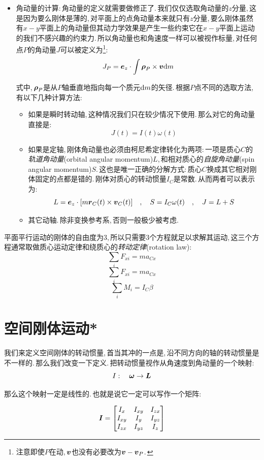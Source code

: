 \begin{itemize}
\item 角动量的计算:\,角动量的定义就需要做修正了.\,我们仅仅选取角动量的$z$分量,\,这是因为要么刚体是薄的,\,对平面上的点角动量本来就只有$z$分量,\,要么刚体虽然有$x-y$平面上的角动量但其动力学效果是产生一些约束它在$x-y$平面上运动的我们不感兴趣的约束力.\,所以角动量也和角速度一样可以被视作标量,\,对任何点$P$的角动量$J$可以被定义为\footnote{注意即使$P$在动,\,$\boldsymbol{v}$也没有必要改为$\boldsymbol{v}-\boldsymbol{v}_P$.\,}:
\[J_P=\boldsymbol{e}_z\cdot \int \boldsymbol{\rho}_P\times \boldsymbol{v}\textrm{d} m\]

式中,\,$\boldsymbol{\rho}_P$是从$P$轴垂直地指向每一个质元$\textrm{d} m$的矢径.\,根据$P$点不同的选取方法,\,有以下几种计算方法:
\begin{itemize}
	\item 如果是瞬时转动轴,\,这种情况我们只在较少情况下使用.\,那么对它的角动量直接是:
	\[J(t)=I(t)\omega(t)\]

	\item 如果是定轴,\,刚体角动量也必须由柯尼希定律转化为两项:\,一项是质心$C$的\emph{轨道角动量}(orbital angular momentum)$L$,\,和相对质心的\emph{自旋角动量}(spin angular momentum)$S$.\,这也是唯一正确的分解方式:\,质心$C$换成其它相对刚体固定的点都是错的.\,刚体对质心的转动惯量$I_C$是常数.\,从而两者可以表示为:
	\[L=\boldsymbol{e}_z\cdot [m\boldsymbol{r}_C(t)\times \boldsymbol{v}_C(t)]\quad,\quad S=I_C\omega(t)\quad,\quad J=L+S\]
	
	\item 其它动轴.\,除非变换参考系,\,否则一般极少被考虑.
\end{itemize}
\end{itemize}

平面平行运动的刚体的自由度为3,\,所以只需要3个方程就足以求解其运动,\,这三个方程通常取做质心运动定律和绕质心的\emph{转动定律}(rotation law):
\[\sum_i F_{xi}=m a_{Cx}\]
\[\sum_i F_{xi}=m a_{Cx}\]
\[\sum_i M_{i}=I_{C} \beta\]

\section{空间刚体运动*}\label{6.3}

我们来定义空间刚体的转动惯量,\,首当其冲的一点是,\,沿不同方向的轴的转动惯量是不一样的.\,那么我们改变一下定义.\,把转动惯量视作从角速度到角动量的一个映射:
\[I:\quad \boldsymbol{\omega}\to \boldsymbol{L}\]

那么这个映射一定是线性的.\,也就是说它一定可以写作一个矩阵:

\[\boldsymbol{I}=\begin{bmatrix}I_{x}&I_{xy}&I_{zx}\\I_{xy}&I_{y}&I_{yz}\\I_{zx}&I_{yz}&I_{z}\end{bmatrix}\]
